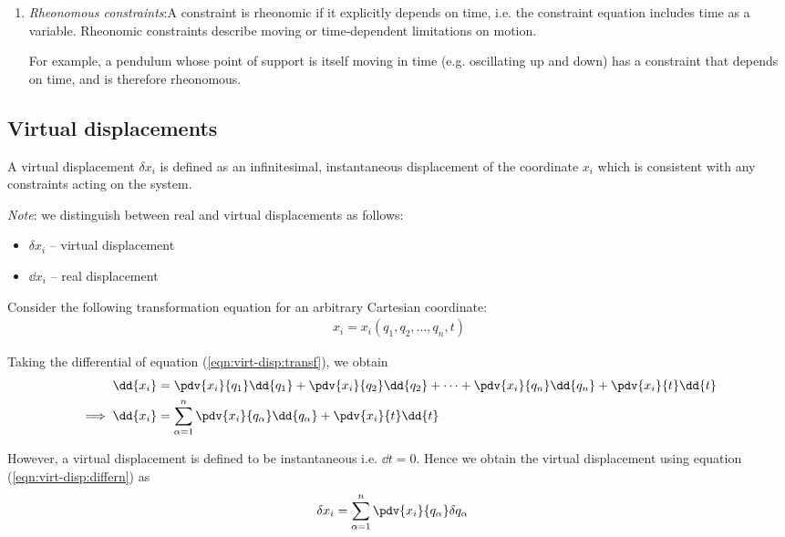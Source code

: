 \begin{itemize}
\begin{enumerate}
		For example, a simple pendulum of fixed length has the constraint $\sqrt{x^2+y^2}-L=0$, which does not involve time explicitly. So this constraint is holonomic as well as schleronomous.
		
		\item \textit{Rheonomous constraints}:A constraint is rheonomic if it explicitly depends on time, i.e. the constraint equation includes time as a variable. Rheonomic constraints describe moving or time-dependent limitations on motion.
		
		For example, a pendulum whose point of support is itself moving in time (e.g. oscillating up and down) has a constraint that depends on time, and is therefore rheonomous.
	\end{enumerate}
\end{itemize}

\setcounter{equation}{0}
\subsection{Virtual displacements}
A virtual displacement $\delta x_i$ is defined as an infinitesimal, instantaneous displacement of the coordinate $x_i$ which is consistent with any constraints acting on the system.

\textit{Note}: we distinguish between real and virtual displacements as follows:
\begin{itemize}
	\item $\delta x_i$ -- virtual displacement
	\item $\dd{x_i}$ -- real displacement
\end{itemize}

Consider the following transformation equation for an arbitrary Cartesian coordinate:
\begin{align}
	x_i=x_i(q_1,q_2,\dots,q_n,t) \label{eqn:virt-disp:transf}
\end{align}

Taking the differential of equation (\ref{eqn:virt-disp:transf}), we obtain
\begin{align}
	\dd{x_i}&=\pdv{x_i}{q_1}\dd{q_1}+\pdv{x_i}{q_2}\dd{q_2}+\cdots+\pdv{x_i}{q_n}\dd{q_n}+\pdv{x_i}{t}\dd{t} \nonumber\\
	\implies\dd{x_i}&=\sum_{\alpha=1}^{n}{\pdv{x_i}{q_\alpha}\dd{q_\alpha}}+\pdv{x_i}{t}\dd{t} \label{eqn:virt-disp:differn}
\end{align}

However, a virtual displacement is defined to be instantaneous i.e. $\dd{t}=0$. Hence we obtain the virtual displacement using equation (\ref{eqn:virt-disp:differn}) as
\begin{align}
	\delta x_i&=\sum_{\alpha=1}^{n}{\pdv{x_i}{q_\alpha}\delta{q_\alpha}} \label{eqn:virt-disp:defn}
\end{align}

